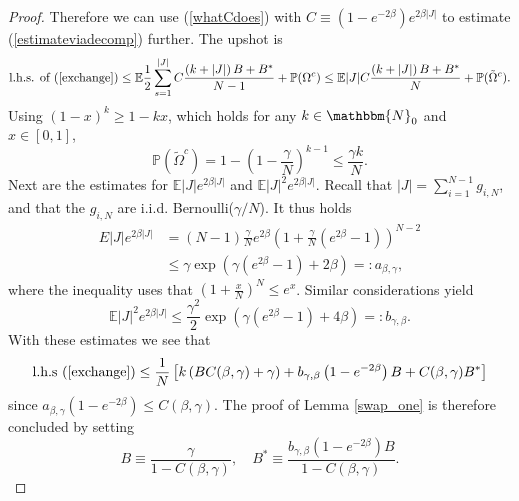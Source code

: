 \documentclass[a4paper,12pt,oneside,reqno]{amsart}
\numberwithin{equation}{section}
\begin{document}
\begin{proof}
Therefore we can use (\ref{whatCdoes}) with $C {\equiv}  \left(1-e^{-2\beta}\right)e^{2\beta |J|}$ to estimate (\ref{estimateviadecomp}) further. The upshot is 
$$\text{l.h.s. of } (\ref{exchange}) \leq {{\mathbb{E}}} \frac{1}{2}\sum\limits_{s=1}^{|J|}C \frac{\left(k+|J|\right)B+B^*}{N-1} + {\mathbb{P}}(\Omega^c)\leq {{\mathbb{E}}} |J| C \frac{\left(k+|J|\right)B+B^*}{N} + {\mathbb{P}}(\tilde \Omega^c) .$$
Using  $(1-x)^{k} \geq 1-kx$, which holds for any $k\in \mathbbm{N}_0$ and $x\in[0,1]$,
$${\mathbb{P}}(\tilde \Omega^c) = 1- \left(1- \frac{\gamma}{N} \right)^{k-1}\leq \frac{\gamma k}{N}.$$
Next are the estimates for ${{\mathbb{E}}} |J|e^{2\beta|J|}$ and ${{\mathbb{E}}} |J|^2e^{2\beta|J|}$. Recall that $|J| = \sum\limits_{i=1}^{N-1} g_{i,N}$, and that the $g_{i,N}$ are i.i.d. Bernoulli($\gamma/N$). 
It thus holds 
\[\begin{aligned}
E |J|e^{2\beta|J|} & = (N-1) \frac{\gamma}{N} e^{2\beta} \left(1+\frac{\gamma}{N}(e^{2\beta}-1)\right)^{N-2} \\
&  \leq \gamma \exp\left(\gamma(e^{2\beta}-1) + 2\beta \right) =: a_{\beta, \gamma},
\end{aligned}\]
where the inequality uses that $(1+\frac{x}{N})^N\leq e^x$. Similar considerations yield
$$ {{\mathbb{E}}} |J|^2e^{2\beta|J|} \leq \frac{\gamma^2}{2} \exp\left(\gamma(e^{2\beta}-1) + 4\beta \right)=: b_{\gamma,\beta}.$$
With these estimates we see that 
\begin{equation}\label{laststepindep}\text{l.h.s } (\ref{exchange})\leq \frac{1}{N} \left[k \left(B C({\beta}, \gamma) + \gamma \right)+b_{\gamma,\beta}\left(1-e^{-2\beta}\right)B+C({\beta}, \gamma) B^*\right]\end{equation}
since $a_{\beta, \gamma} \left(1-e^{-2\beta}\right) \leq C({\beta}, \gamma)$. 
The proof of Lemma \ref{swap_one} is therefore concluded by setting
\[ 
B {\equiv} \frac{\gamma}{1-C({\beta}, \gamma)}, \quad B^* {\equiv} \frac{b_{\gamma,\beta}\left(1-e^{-2\beta}\right)B}{1-C({\beta}, \gamma)}.
\] 
\end{proof}
\end{document}
